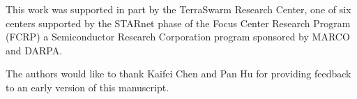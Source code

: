 \begin{acks}
  This work was supported in part by the TerraSwarm Research Center, one of six
  centers supported by the STARnet phase of the Focus Center Research Program
  (FCRP) a Semiconductor Research Corporation program sponsored by MARCO and
  DARPA.

  The authors would like to thank Kaifei Chen and Pan Hu for providing feedback
  to an early version of this manuscript.
\end{acks}


